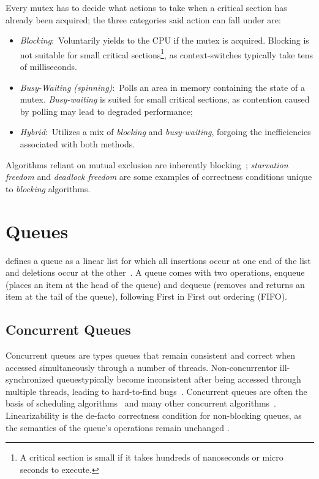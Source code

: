 Every mutex has to decide what actions to take when a critical section has
already been acquired; the three categories said action can fall under are: 
\begin{itemize}
\item \emph{Blocking}:~Voluntarily yields to the CPU if the mutex is acquired.
Blocking is not suitable for small critical sections\footnote{A critical
section is small if it takes hundreds of nanoseconds or micro seconds to
execute.}, as context-switches typically take tens of milliseconds.
\item \emph{Busy-Waiting (spinning)}:~Polls an area in memory containing the
state of a mutex. \emph{Busy-waiting} is suited for small critical sections, as
contention caused by polling may lead to degraded performance;
\item \emph{Hybrid}:~Utilizes a mix of \emph{blocking} and \emph{busy-waiting},
forgoing the inefficiencies associated with both methods.
\end{itemize}

Algorithms reliant on mutual exclusion are inherently
blocking~\citep[Section~3.8]{herlihy2020art}; \emph{starvation freedom} and
\emph{deadlock freedom} are some examples of correctness conditions unique to
\emph{blocking} algorithms.


\section{Queues}
\citeauthor{knuth1968art} defines a queue as a linear list for which all
insertions occur at one end of the list and deletions occur at the
other~\citep{knuth1968art}. A queue comes with two operations, enqueue (places
an item at the head of the queue) and dequeue (removes and returns an item at
the tail of the queue), following First in First out ordering (FIFO).

\subsection{Concurrent Queues}
Concurrent queues are types queues that remain consistent and correct when
accessed simultaneously through a number of threads. Non-concurrent\textemdash or
ill-synchronized queues\textemdash typically become inconsistent after being
accessed through multiple threads, leading
to hard-to-find bugs~\citep{yahav2003automatically}. Concurrent queues are often the basis of scheduling
algorithms~\citep{debattista2002high} and many other concurrent
algorithms~\citep{yahav2003automatically}. Linearizability is the de-facto correctness condition
for non-blocking queues, as the semantics of the queue's
operations remain unchanged \citep{mellor1987concurrent, valois1995datastructures}.


